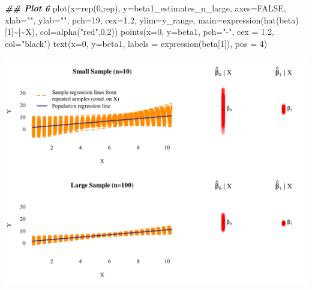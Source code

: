 \documentclass[
  14pt,
]{memoir}
\newenvironment{Shaded}{\begin{snugshade}}{\end{snugshade}}
\newcommand{\AttributeTok}[1]{\textcolor[rgb]{0.77,0.63,0.00}{#1}}
\newcommand{\ConstantTok}[1]{\textcolor[rgb]{0.00,0.00,0.00}{#1}}
\newcommand{\DecValTok}[1]{\textcolor[rgb]{0.00,0.00,0.81}{#1}}
\newcommand{\DocumentationTok}[1]{\textcolor[rgb]{0.56,0.35,0.01}{\textbf{\textit{#1}}}}
\newcommand{\FloatTok}[1]{\textcolor[rgb]{0.00,0.00,0.81}{#1}}
\newcommand{\FunctionTok}[1]{\textcolor[rgb]{0.00,0.00,0.00}{#1}}
\newcommand{\NormalTok}[1]{#1}
\newcommand{\SpecialCharTok}[1]{\textcolor[rgb]{0.00,0.00,0.00}{#1}}
\newcommand{\StringTok}[1]{\textcolor[rgb]{0.31,0.60,0.02}{#1}}
\begin{document}
\begin{Shaded}
\begin{Highlighting}[]
\DocumentationTok{\#\# Plot 6}
\FunctionTok{plot}\NormalTok{(}\AttributeTok{x=}\FunctionTok{rep}\NormalTok{(}\DecValTok{0}\NormalTok{,rep), }\AttributeTok{y=}\NormalTok{beta1\_estimates\_n\_large, }\AttributeTok{axes=}\ConstantTok{FALSE}\NormalTok{, }
     \AttributeTok{xlab=}\StringTok{""}\NormalTok{, }\AttributeTok{ylab=}\StringTok{""}\NormalTok{, }\AttributeTok{pch=}\DecValTok{19}\NormalTok{, }\AttributeTok{cex=}\FloatTok{1.2}\NormalTok{, }\AttributeTok{ylim=}\NormalTok{y\_range,}
  \AttributeTok{main=}\FunctionTok{expression}\NormalTok{(}\FunctionTok{hat}\NormalTok{(beta)[}\DecValTok{1}\NormalTok{]}\SpecialCharTok{\textasciitilde{}}\StringTok{\textquotesingle{}|\textquotesingle{}}\SpecialCharTok{\textasciitilde{}}\NormalTok{X), }\AttributeTok{col=}\FunctionTok{alpha}\NormalTok{(}\StringTok{"red"}\NormalTok{,}\FloatTok{0.2}\NormalTok{))}
\FunctionTok{points}\NormalTok{(}\AttributeTok{x=}\DecValTok{0}\NormalTok{, }\AttributeTok{y=}\NormalTok{beta1, }\AttributeTok{pch=}\StringTok{"{-}"}\NormalTok{, }\AttributeTok{cex =} \FloatTok{1.2}\NormalTok{, }\AttributeTok{col=}\StringTok{"black"}\NormalTok{)}
\FunctionTok{text}\NormalTok{(}\AttributeTok{x=}\DecValTok{0}\NormalTok{, }\AttributeTok{y=}\NormalTok{beta1, }\AttributeTok{labels =} \FunctionTok{expression}\NormalTok{(beta[}\DecValTok{1}\NormalTok{]), }\AttributeTok{pos =} \DecValTok{4}\NormalTok{)}
\end{Highlighting}
\end{Shaded}

\begin{center}\includegraphics[width=\textwidth]{figure/minimal-unnamed-chunk-61-1} \end{center}
\end{document}
